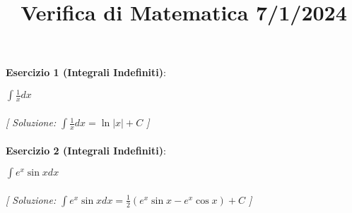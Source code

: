 \documentclass{article}
\title{\raggedright Verifica di Matematica  7/1/2024}
\date{}
\begin{document}
\maketitle

\textbf{Esercizio 1 (Integrali Indefiniti)}:\\
\par $\int \frac{1}{x}  dx$ \\\\

\textit{[ Soluzione: $\int \frac{1}{x}  dx = \ln |x| + C$ ]}\\\\

\textbf{Esercizio 2 (Integrali Indefiniti)}:\\
\par $\int e^x \sin x  dx$ \\\\

\textit{[ Soluzione: $\int e^x \sin x  dx = \frac{1}{2}(e^x\sin x - e^x\cos x) + C$ ]}\\\\
\end{document}
